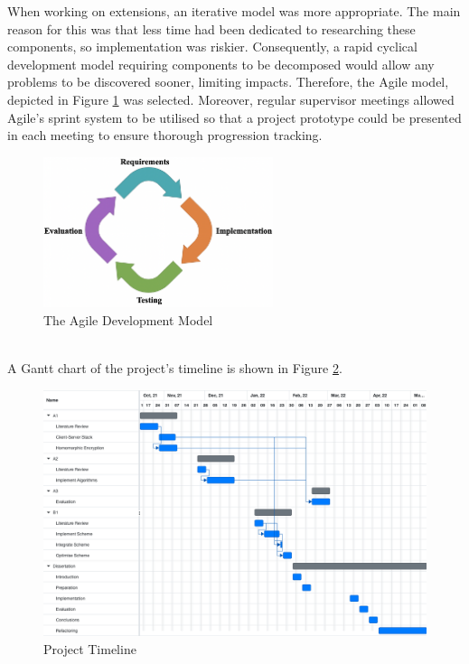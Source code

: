 When working on extensions, an iterative model was more appropriate. The main reason for this was that less time had been dedicated to researching these components, so implementation was riskier. Consequently, a rapid cyclical development model requiring components to be decomposed would allow any problems to be discovered sooner, limiting impacts. Therefore, the Agile model, depicted in Figure \ref{fig:agile} was selected. Moreover, regular supervisor meetings allowed Agile's sprint system to be utilised so that a project prototype could be presented in each meeting to ensure thorough progression tracking.
\begin{figure}[ht]
    \centering
    \includegraphics[width=0.6\textwidth]{figures/agile.png}
    \caption{The Agile Development Model}
    \label{fig:agile}
\end{figure}
\\ \indent
A Gantt chart of the project's timeline is shown in Figure \ref{fig:gantt}.
\begin{figure}[H]
    \centering
    \includegraphics[width=1\textwidth]{figures/gantt.png}
    \caption{Project Timeline}
    \label{fig:gantt}
\end{figure}


